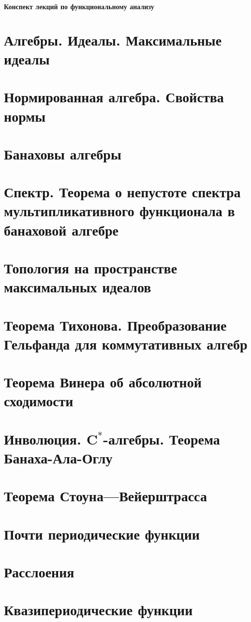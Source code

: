 \documentclass[a4paper,12pt]{extarticle}
\theoremstyle{definition}
\begin{document}
    \begin{titlepage}
        \vfill
        \centering\Huge\bfseries Конспект лекций по функциональному анализу
        \vfill
    \end{titlepage}
    \tableofcontents
    \section{Алгебры. Идеалы. Максимальные идеалы}

    \section{Нормированная алгебра. Свойства нормы}

    \section{Банаховы алгебры}

    \section{Спектр. Теорема о непустоте спектра мультипликативного функционала в банаховой алгебре}

    \section{Топология на пространстве максимальных идеалов}

    \section{Теорема Тихонова. Преобразование Гельфанда для коммутативных алгебр}

    \section{Теорема Винера об абсолютной сходимости}

    \section{Инволюция. $\mathbf{C^*}$-алгебры. Теорема Банаха-Ала-Оглу}

    \section{Теорема Стоуна---Вейерштрасса}

    \section{Почти периодические функции}

    \section{Расслоения}

    \section{Квазипериодические функции}
\end{document}
